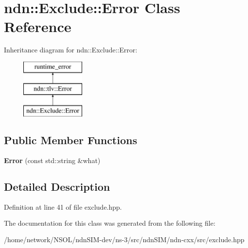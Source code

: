 \hypertarget{classndn_1_1Exclude_1_1Error}{}\section{ndn\+:\+:Exclude\+:\+:Error Class Reference}
\label{classndn_1_1Exclude_1_1Error}
Inheritance diagram for ndn\+:\+:Exclude\+:\+:Error\+:\begin{figure}[H]
\begin{center}
\leavevmode
\includegraphics[height=3.000000cm]{classndn_1_1Exclude_1_1Error}
\end{center}
\end{figure}
\subsection*{Public Member Functions}
\begin{DoxyCompactItemize}
\item 
{\bfseries Error} (const std\+::string \&what)\hypertarget{classndn_1_1Exclude_1_1Error_ae1ca68dded3fff1793b0214d96b26786}{}\label{classndn_1_1Exclude_1_1Error_ae1ca68dded3fff1793b0214d96b26786}

\end{DoxyCompactItemize}


\subsection{Detailed Description}


Definition at line 41 of file exclude.\+hpp.



The documentation for this class was generated from the following file\+:\begin{DoxyCompactItemize}
\item 
/home/network/\+N\+S\+O\+L/ndn\+S\+I\+M-\/dev/ns-\/3/src/ndn\+S\+I\+M/ndn-\/cxx/src/exclude.\+hpp\end{DoxyCompactItemize}
